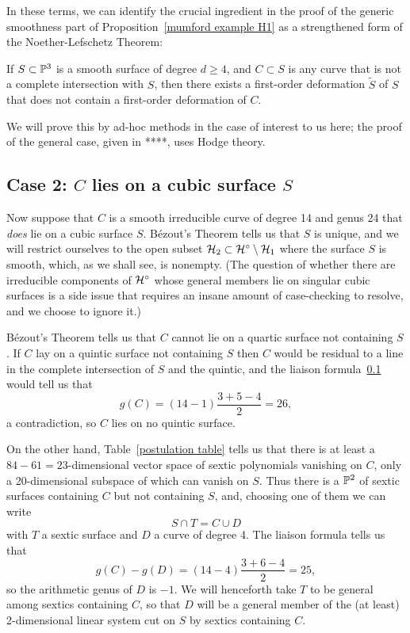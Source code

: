 In these terms, we can identify the crucial ingredient in the proof of the generic smoothness part of Proposition~\ref{mumford example H1} as a strengthened form of the Noether-Lefschetz Theorem:

\begin{theorem}
If $S \subset \PP^3$ is a smooth surface of degree $d \geq 4$, and $C \subset S$ is any curve that is not a complete intersection with $S$, then there exists a first-order deformation $\tilde S$ of $S$ that does not contain a first-order deformation of $C$.
\end{theorem}

We will prove this by ad-hoc methods in the case of interest to us here; the proof of the general case, given in ****, uses Hodge theory.


\subsection{Case 2: $C$ lies on a cubic surface $S$}

Now suppose that $C$ is a smooth irreducible curve of degree 14 and genus 24 that \emph{does} lie on a cubic surface $S$. B\'ezout's Theorem tells us that  $S$  is unique, and we will restrict ourselves to the open subset $\cH_2 \subset \cH^\circ \setminus \cH_1$ where the surface $S$ is smooth, which, as we shall see, is nonempty. (The question of whether there are irreducible components of $\cH^\circ$ whose general members lie on singular cubic surfaces is a side issue that requires an insane amount of case-checking to resolve, and we choose to ignore it.) 

B\'ezout's Theorem tells us that $C$ cannot lie on a quartic surface not containing $S$. If $C$ lay on a quintic surface not containing $S$ then $C$ would be residual to a line in the complete intersection of $S$ and the quintic, and the liaison formula~\ref{} would tell us that 
$$
g(C) = (14-1)\frac{3+5-4}{2} = 26,
$$
a contradiction, so $C$ lies on no quintic surface.

On the other hand, Table~\ref{postulation table} tells us that there is at least a $84-61 = 23$-dimensional vector space of sextic polynomials vanishing on  $C$, only a 20-dimensional subspace of which can vanish on $S$. Thus there is a $\PP^2$ of sextic surfaces containing $C$ but not containing $S$, and, choosing one of them we can write
$$
S \cap T = C \cup D
$$
with $T$ a sextic surface and $D$ a curve of degree 4. The liaison formula  tells us that
$$
g(C) - g(D) = (14 - 4)\frac{3+6-4}{2} = 25,
$$
so the arithmetic genus of $D$ is $-1$. We will henceforth take $T$ to be general among sextics containing $C$, so that $D$ will be a general member of the (at least) 2-dimensional linear system cut on $S$ by sextics containing $C$.

